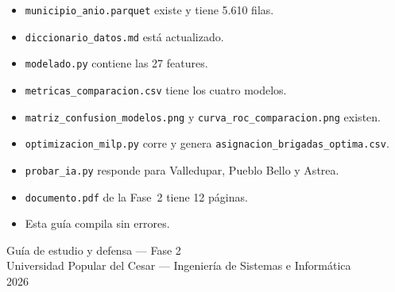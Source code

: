 \documentclass[11pt,a4paper]{article}
\newcommand{\code}[1]{\texttt{#1}}
\begin{document}
\begin{itemize}[leftmargin=*,label=$\square$]
  \item \code{municipio_anio.parquet} existe y tiene 5.610 filas.
  \item \code{diccionario_datos.md} está actualizado.
  \item \code{modelado.py} contiene las 27 features.
  \item \code{metricas_comparacion.csv} tiene los cuatro modelos.
  \item \code{matriz_confusion_modelos.png} y \code{curva_roc_comparacion.png} existen.
  \item \code{optimizacion_milp.py} corre y genera \code{asignacion_brigadas_optima.csv}.
  \item \code{probar_ia.py} responde para Valledupar, Pueblo Bello y Astrea.
  \item \code{documento.pdf} de la Fase~2 tiene 12 páginas.
  \item Esta guía compila sin errores.
\end{itemize}

\vfill
\begin{center}
\small\color{grisoscuro}
Guía de estudio y defensa --- Fase 2\\
Universidad Popular del Cesar --- Ingeniería de Sistemas e Informática\\
2026
\end{center}
\end{document}
